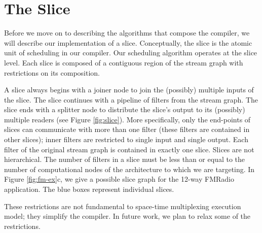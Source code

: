 \section{The Slice}
Before we move on to describing the algorithms that compose the
compiler, we will describe our implementation of a
slice. Conceptually, the slice is the atomic unit of scheduling in our
compiler.  Our scheduling algorithm operates at the slice level.
Each slice is composed of a contiguous region of the stream
graph with restrictions on its composition. 

A slice always begins with a joiner node to join the (possibly)
multiple inputs of the slice.  The slice continues with a pipeline of
filters from the stream graph.  The slice ends with a splitter node to
distribute the slice's output to its (possibly) multiple readers (see
Figure \ref{fig:slice}).  More specifically, only the end-points of
slices can communicate with more than one filter (these filters are
contained in other slices); inner filters are restricted to single
input and single output.  Each filter of the original stream graph is
contained in exactly one slice.  Slices are not hierarchical.  The
number of filters in a slice must be less than or equal to the number
of computational nodes of the architecture to which we are targeting.
In Figure \ref{fig:fm-ex}c, we give a possible slice graph for the
12-way FMRadio application.  The blue boxes represent individual
slices.

These restrictions are not fundamental to space-time multiplexing
execution model; they simplify the compiler.  In future work, we plan
to relax some of the restrictions.

